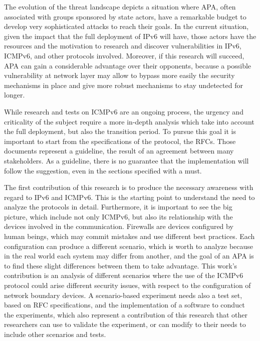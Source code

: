 \documentclass[12pt]{article}
\begin{document}
The evolution of the threat landscape depicts a situation where APA, often associated with groups sponsored by state actors, have a remarkable budget to develop very sophisticated attacks to reach their goals. In the current situation, given the impact that the full deployment of IPv6 will have, those actors have the resources and the motivation to research and discover vulnerabilities in IPv6, ICMPv6, and other protocols involved. 
Moreover, if this research will succeed, APA can gain a considerable advantage over their opponents, because a possible vulnerability at network layer may allow to bypass more easily the security mechanisms in place and give more robust mechanisms to stay undetected for longer.

While research and tests on ICMPv6 are an ongoing process, the urgency and criticality of the subject require a more in-depth analysis which take into account the full deployment, but also the transition period. To pursue this goal it is important to start from the specifications of the protocol, the RFCs. Those documents represent a guideline, the result of an agreement between many stakeholders. As a guideline, there is no guarantee that the implementation will follow the suggestion, even in the sections specified with a must.

The first contribution of this research is to produce the necessary awareness with regard to IPv6 and ICMPv6. This is the starting point to understand the need to analyze the protocols in detail. Furthermore, it is important to see the big picture, which include not only ICMPv6, but also its relationship with the devices involved in the communication. Firewalls are devices configured by human beings, which may commit mistakes and use different best practices. Each configuration can produce a different scenario, which is worth to analyze because in the real world each system may differ from another, and the goal of an APA is to find these slight differences between them to take advantage. This work's contribution is an analysis of different scenarios where the use of the ICMPv6 protocol could arise different security issues, with respect to the configuration of network boundary devices. A scenario-based experiment needs also a test set, based on RFC specifications, and the implementation of a software to conduct the experiments, which also represent a contribution of this research that other researchers can use to validate the experiment, or can modify to their needs to include other scenarios and tests.
\end{document}
